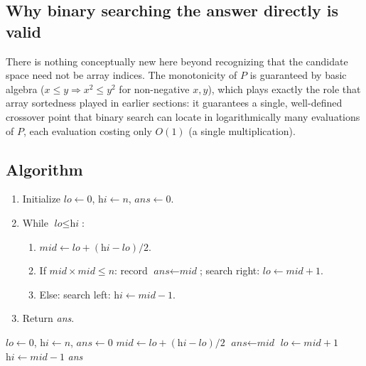 \subsection*{Why binary searching the answer directly is valid}

There is nothing conceptually new here beyond recognizing that the
candidate space need not be array indices. The monotonicity of $P$ is
guaranteed by basic algebra ($x \le y \Rightarrow x^2 \le y^2$ for
non-negative $x, y$), which plays exactly the role that array sortedness
played in earlier sections: it guarantees a single, well-defined crossover
point that binary search can locate in logarithmically many evaluations of
$P$, each evaluation costing only $O(1)$ (a single multiplication).

\subsection*{Algorithm}

\begin{enumerate}
  \item Initialize $\textit{lo} \gets 0$, $\textit{hi} \gets n$,
        $\textit{ans} \gets 0$.
  \item While $\textit{lo} \le \textit{hi}$:
  \begin{enumerate}
    \item $\textit{mid} \gets \textit{lo}+(\textit{hi}-\textit{lo})/2$.
    \item If $\textit{mid} \times \textit{mid} \le n$: record
          $\textit{ans} \gets \textit{mid}$; search right:
          $\textit{lo} \gets \textit{mid}+1$.
    \item Else: search left: $\textit{hi} \gets \textit{mid}-1$.
  \end{enumerate}
  \item Return \textit{ans}.
\end{enumerate}

\begin{algorithm}[H]
\caption{Floor of Square Root}
\begin{algorithmic}[1]
  \State $\textit{lo} \gets 0$, $\textit{hi} \gets n$, $\textit{ans} \gets 0$
    \State $\textit{mid} \gets \textit{lo}+(\textit{hi}-\textit{lo})/2$
      \State $\textit{ans} \gets \textit{mid}$
      \State $\textit{lo} \gets \textit{mid} + 1$
    \Else
      \State $\textit{hi} \gets \textit{mid} - 1$
    \EndIf
  \EndWhile
  \State \Return \textit{ans}
\EndProcedure
\end{algorithmic}
\end{algorithm}

